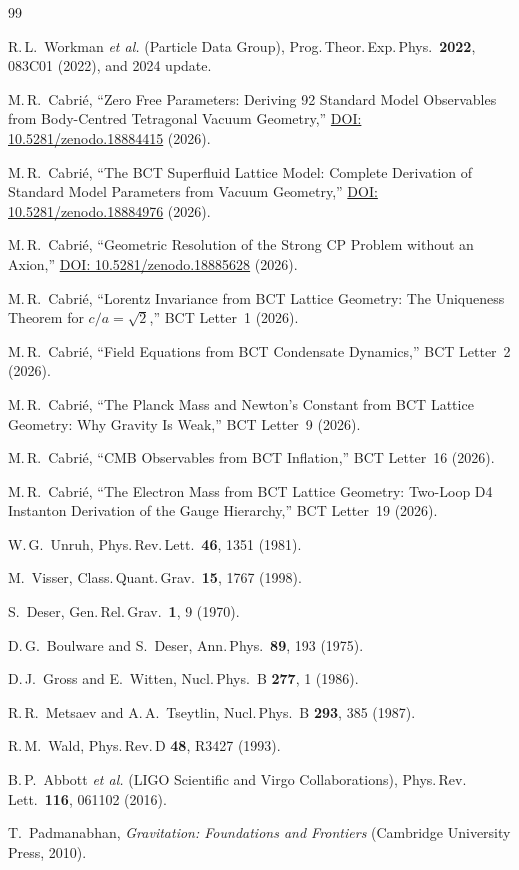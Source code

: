 \documentclass[twocolumn,10pt,a4paper]{article}
\begin{document}
\begin{thebibliography}{99}

R.\,L.~Workman \textit{et al.} (Particle Data Group),
Prog.\,Theor.\,Exp.\,Phys.\ \textbf{2022}, 083C01 (2022), and 2024 update.

M.\,R.~Cabri\'{e}, ``Zero Free Parameters: Deriving 92 Standard Model
Observables from Body-Centred Tetragonal Vacuum Geometry,''
\href{https://doi.org/10.5281/zenodo.18884415}{DOI: 10.5281/zenodo.18884415}
(2026).

M.\,R.~Cabri\'{e}, ``The BCT Superfluid Lattice Model: Complete Derivation
of Standard Model Parameters from Vacuum Geometry,''
\href{https://doi.org/10.5281/zenodo.18884976}{DOI: 10.5281/zenodo.18884976}
(2026).

M.\,R.~Cabri\'{e}, ``Geometric Resolution of the Strong CP Problem without
an Axion,''
\href{https://doi.org/10.5281/zenodo.18885628}{DOI: 10.5281/zenodo.18885628}
(2026).

M.\,R.~Cabri\'{e}, ``Lorentz Invariance from BCT Lattice Geometry: The
Uniqueness Theorem for $c/a = \sqrt{2}$,'' BCT Letter~1 (2026).

M.\,R.~Cabri\'{e}, ``Field Equations from BCT Condensate Dynamics,''
BCT Letter~2 (2026).

M.\,R.~Cabri\'{e}, ``The Planck Mass and Newton's Constant from BCT
Lattice Geometry: Why Gravity Is Weak,'' BCT Letter~9 (2026).

M.\,R.~Cabri\'{e}, ``CMB Observables from BCT Inflation,''
BCT Letter~16 (2026).

M.\,R.~Cabri\'{e}, ``The Electron Mass from BCT Lattice Geometry:
Two-Loop D4 Instanton Derivation of the Gauge Hierarchy,''
BCT Letter~19 (2026).

W.\,G.~Unruh, Phys.\,Rev.\,Lett.\ \textbf{46}, 1351 (1981).

M.~Visser, Class.\,Quant.\,Grav.\ \textbf{15}, 1767 (1998).

S.~Deser, Gen.\,Rel.\,Grav.\ \textbf{1}, 9 (1970).

D.\,G.~Boulware and S.~Deser,
Ann.\,Phys.\ \textbf{89}, 193 (1975).

D.\,J.~Gross and E.~Witten,
Nucl.\,Phys.\ B \textbf{277}, 1 (1986).

R.\,R.~Metsaev and A.\,A.~Tseytlin,
Nucl.\,Phys.\ B \textbf{293}, 385 (1987).

R.\,M.~Wald, Phys.\,Rev.\,D \textbf{48}, R3427 (1993).

B.\,P.~Abbott \textit{et al.} (LIGO Scientific and Virgo Collaborations),
Phys.\,Rev.\,Lett.\ \textbf{116}, 061102 (2016).

T.~Padmanabhan, \textit{Gravitation: Foundations and Frontiers}
(Cambridge University Press, 2010).

\end{thebibliography}
\end{document}
